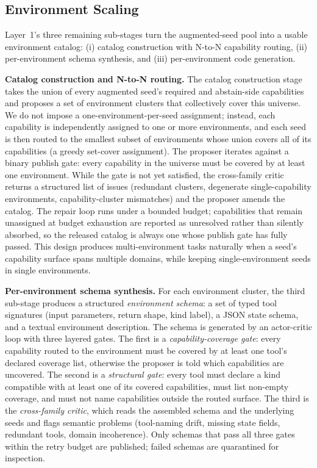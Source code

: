 \subsection{Environment Scaling}
\label{app:env-scaling}

Layer~1's three remaining sub-stages turn the augmented-seed pool into a usable environment catalog: (i) catalog construction with N-to-N capability routing, (ii) per-environment schema synthesis, and (iii) per-environment code generation.

\textbf{Catalog construction and N-to-N routing.}
The catalog construction stage takes the union of every augmented seed's required and abstain-side capabilities and proposes a set of environment clusters that collectively cover this universe. We do not impose a one-environment-per-seed assignment; instead, each capability is independently assigned to one or more environments, and each seed is then routed to the smallest subset of environments whose union covers all of its capabilities (a greedy set-cover assignment). The proposer iterates against a binary publish gate: every capability in the universe must be covered by at least one environment. While the gate is not yet satisfied, the cross-family critic returns a structured list of issues (redundant clusters, degenerate single-capability environments, capability-cluster mismatches) and the proposer amends the catalog. The repair loop runs under a bounded budget; capabilities that remain unassigned at budget exhaustion are reported as unresolved rather than silently absorbed, so the released catalog is always one whose publish gate has fully passed. This design produces multi-environment tasks naturally when a seed's capability surface spans multiple domains, while keeping single-environment seeds in single environments.

\textbf{Per-environment schema synthesis.}
For each environment cluster, the third sub-stage produces a structured \emph{environment schema}: a set of typed tool signatures (input parameters, return shape, kind label), a JSON state schema, and a textual environment description. The schema is generated by an actor-critic loop with three layered gates. The first is a \emph{capability-coverage gate}: every capability routed to the environment must be covered by at least one tool's declared coverage list, otherwise the proposer is told which capabilities are uncovered. The second is a \emph{structural gate}: every tool must declare a kind compatible with at least one of its covered capabilities, must list non-empty coverage, and must not name capabilities outside the routed surface. The third is the \emph{cross-family critic}, which reads the assembled schema and the underlying seeds and flags semantic problems (tool-naming drift, missing state fields, redundant tools, domain incoherence). Only schemas that pass all three gates within the retry budget are published; failed schemas are quarantined for inspection.

